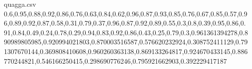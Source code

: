\documentclass{llncs}
\begin{document}
\begin{filecontents*}{quagga.csv}
0.6,0.95,0.88,0.92,0.86,0.76,0.63,0.84,0.62,0.96,0.87,0.93,0.85,0.76,0.67,0.85,0.57,0.96,0.89,0.92,0.87,0.58,0.31,0.79,0.37,0.96,0.87,0.92,0.89,0.55,0.3,0.8,0.39,0.95,0.86,0.91,0.84,0.49,0.24,0.78,0.29,0.94,0.83,0.92,0.86,0.43,0.25,0.79,0.3,0.961361394278,0.890989805985,0.920994021803,0.870003516587,0.576620232924,0.308752411129,0.791307670144,0.369808410608,0.960260363138,0.869133264817,0.924670433145,0.886770244821,0.546166250415,0.298690776246,0.795921662903,0.392229417187
\end{filecontents*}
\end{document}
